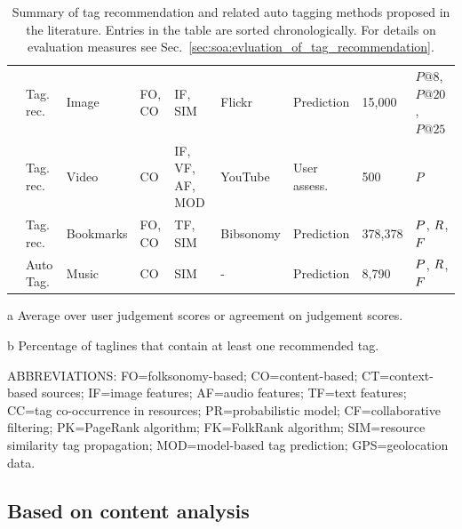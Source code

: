 \begin{table}
\begin{threeparttable}
\begin{tabular}{@{}p{3.0cm}p{1.35cm}P{2.3cm}P{1.6cm}P{2.3cm}p{1.6cm}p{1.45cm}T{1.0cm}p{2.5cm}@{}}
\cite{Sevil2010a} & Tag. rec. & Image & FO, CO & IF, SIM & Flickr & Prediction & 15,000 & $P@8$, $P@20$, $P@25$ \\
\cite{Toderici2010} & Tag. rec. & Video & CO & IF, VF, AF, MOD & YouTube & User assess. & 500 & $P$ \\
\cite{Lops2012} & Tag. rec. & Bookmarks & FO, CO & TF, SIM & Bibsonomy & Prediction & 378,378 & $P$, $R$, $F$ \\
\cite{moha2012} & Auto Tag. & Music & CO & SIM & - & Prediction & 8,790 & $P$, $R$, $F$ \\
\bottomrule
\end{tabular}
\begin{tablenotes}
    \item[a] Average over user judgement scores or agreement on judgement scores.
    \item[b] Percentage of taglines that contain at least one recommended tag. 
    \vspace{0.20cm}
    \item[] ABBREVIATIONS: FO=folksonomy-based; CO=content-based; CT=context-based sources; IF=image features; AF=audio features; TF=text features; CC=tag co-occurrence in resources; PR=probabilistic model; CF=collaborative filtering; PK=PageRank algorithm; FK=FolkRank algorithm; SIM=resource similarity tag propagation; MOD=model-based tag prediction; GPS=geolocation data.
\end{tablenotes}
\caption[Summary of existing tag recommendation approaches]{Summary of tag recommendation and related auto tagging methods proposed in the literature. Entries in the table are sorted chronologically. For details on evaluation measures see Sec.~\ref{sec:soa:evluation_of_tag_recommendation}.}
\label{tab:soa_methods_comparisson}
\end{threeparttable}
\end{table}


\subsection{Based on content analysis}
\label{sec:soa:tag_recommendation_content_analysis}

